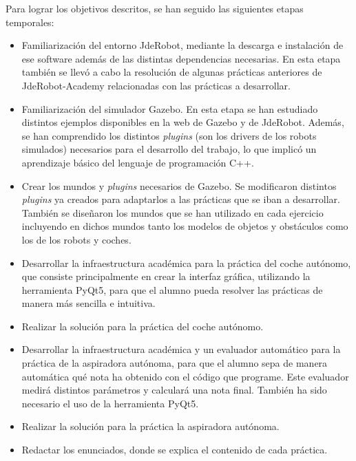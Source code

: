 Para lograr los objetivos descritos, se han seguido las siguientes etapas temporales:
\begin{itemize}
	\item Familiarización del entorno JdeRobot, mediante la descarga e instalación de ese software además de las distintas dependencias necesarias. En esta etapa también se llevó a cabo la resolución de algunas prácticas anteriores de JdeRobot-Academy relacionadas con las prácticas a desarrollar.

	\item Familiarización del simulador Gazebo. En esta etapa se han estudiado distintos ejemplos disponibles en la web de Gazebo y de JdeRobot. Además, se han comprendido los distintos \textit{plugins} (son los drivers de los robots simulados) necesarios para el desarrollo del trabajo, lo que implicó un aprendizaje básico del lenguaje de programación C++.

	\item Crear los mundos y \textit{plugins} necesarios de Gazebo.  Se modificaron distintos \textit{plugins} ya creados para adaptarlos a las prácticas que se iban a desarrollar. También se diseñaron los mundos que se han utilizado en cada ejercicio incluyendo en dichos mundos tanto los modelos de objetos y obstáculos como los de los robots y coches.

	\item Desarrollar la infraestructura académica para la práctica del coche autónomo, que consiste principalmente en crear la interfaz gráfica, utilizando la herramienta PyQt5, para que el alumno pueda resolver las prácticas de manera más sencilla e intuitiva.
	
	\item Realizar la solución para la práctica del coche autónomo.

	\item Desarrollar la infraestructura académica y un evaluador automático para la práctica de la aspiradora autónoma, para que el alumno sepa de manera automática qué nota ha obtenido con el código que programe. Este evaluador medirá distintos parámetros y calculará una nota final. También ha sido necesario el uso de la herramienta PyQt5.

	\item Realizar la solución para la práctica la aspiradora autónoma.

	\item Redactar los enunciados, donde se explica el contenido de cada práctica.
\end{itemize}

